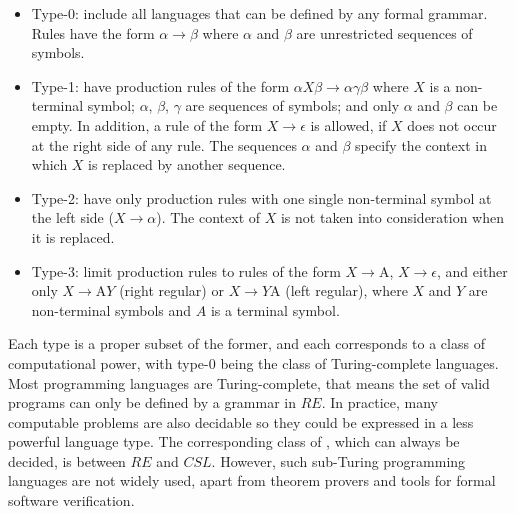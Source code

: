 \begin{itemize}
\item Type-0:  include all 
 languages that can be defined by any formal grammar. Rules have the form
 $\alpha \rightarrow \beta$ where $\alpha$ and $\beta$ are unrestricted
 sequences of symbols.
\item Type-1:  have production
 rules of the form $\alpha X\beta \rightarrow \alpha\gamma\beta$
 where $X$ is a non-terminal symbol; $\alpha$, $\beta$, $\gamma$ are
 sequences of symbols; and only $\alpha$ and $\beta$ can be empty.
 In addition, a rule of the form $X \rightarrow \epsilon$ is allowed, if 
 $X$ does not occur at the right side of any rule. The sequences
 $\alpha$ and $\beta$ specify the context in which $X$ is replaced by 
 another sequence.
\item Type-2:  have only production 
 rules with one single non-terminal symbol at the left side 
 ($X \rightarrow \alpha$). The context of $X$ is not taken into 
 consideration when it is replaced.
\item Type-3:  limit production rules to
 rules of the form $X \rightarrow \text{A}$, $X \rightarrow \epsilon$,
 and either only $X \rightarrow \text{A}Y$ (right regular) or
 $X \rightarrow Y\text{A}$ (left regular), where $X$ and $Y$ are 
 non-terminal symbols and $A$ is a terminal symbol.
\end{itemize}

\noindent
Each type is a proper subset of the former, and each corresponds to a class 
of computational power, with type-0 being the class of Turing-complete 
languages. Most programming languages are Turing-complete, that means the set
of valid programs can only be defined by a grammar in $RE$. In practice, 
many computable problems are also decidable so they could be expressed in 
a less powerful language type. The corresponding class of , which can always be decided, is between $RE$ and $CSL$. However,
such sub-Turing programming languages are not widely used, apart from theorem 
provers and tools for formal software verification. 

